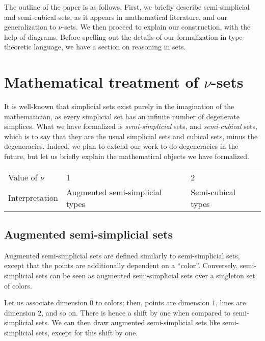 \documentclass[10pt]{art.cls/art}
\def\graymidrule{\arrayrulecolor{gray30}\midrule\arrayrulecolor{gray65}}
\begin{document}
The outline of the paper is as follows. First, we briefly describe semi-simplicial and semi-cubical sets, as it appears in mathematical literature, and our generalization to $\nu$-sets. We then proceed to explain our construction, with the help of diagrams. Before spelling out the details of our formalization in type-theoretic language, we have a section on reasoning in sets.

\section{Mathematical treatment of \texorpdfstring{$\nu$}{𝜈}-sets}
It is well-known that simplicial sets exist purely in the imagination of the mathematician, as every simplicial set has an infinite number of degenerate simplices. What we have formalized is \emph{semi-simplicial} sets, and \emph{semi-cubical} sets, which is to say that they are the usual simplicial sets and cubical sets, minus the degeneracies. Indeed, we plan to extend our work to do degeneracies in the future, but let us briefly explain the mathematical objects we have formalized.

\begin{table}[H]
  \begin{tabularx}{\linewidth}{p{.2\linewidth}|p{.4\linewidth}|p{.3\linewidth}}
    \toprule
    Value of $\nu$ & 1                               & 2                  \\
    \graymidrule
    Interpretation & Augmented semi-simplicial types & Semi-cubical types \\
    \bottomrule
  \end{tabularx}
\end{table}

\subsection{Augmented semi-simplicial sets}
Augmented semi-simplicial sets are defined similarly to semi-simplicial sets, except that the points are additionally dependent on a ``color''. Conversely, semi-simplicial sets can be seen as augmented semi-simplicial sets over a singleton set of colors.

Let us associate dimension $0$ to colors; then, points are dimension $1$, lines are dimension $2$, and so on. There is hence a shift by one when compared to semi-simplicial sets. We can then draw augmented semi-simplicial sets like semi-simplicial sets, except for this shift by one.
\end{document}

